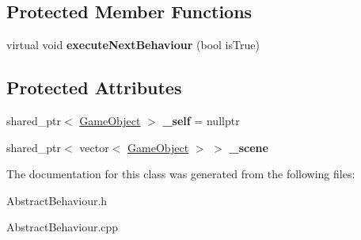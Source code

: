 \subsection*{Protected Member Functions}
\begin{DoxyCompactItemize}
\item 
\mbox{\label{class_abstract_behaviour_a931021cf02c0a2dd40fac4a86d1d5d25}} 
virtual void {\bfseries execute\+Next\+Behaviour} (bool is\+True)
\end{DoxyCompactItemize}
\subsection*{Protected Attributes}
\begin{DoxyCompactItemize}
\item 
\mbox{\label{class_abstract_behaviour_a4e825e734fdfe11ee2d030f909765845}} 
shared\+\_\+ptr$<$ \mbox{\hyperlink{class_game_object}{Game\+Object}} $>$ {\bfseries \+\_\+self} = nullptr
\item 
\mbox{\label{class_abstract_behaviour_a4c97685f487ce0f429276df8d003b70e}} 
shared\+\_\+ptr$<$ vector$<$ \mbox{\hyperlink{class_game_object}{Game\+Object}} $>$ $>$ {\bfseries \+\_\+scene}
\end{DoxyCompactItemize}


The documentation for this class was generated from the following files\+:\begin{DoxyCompactItemize}
\item 
Abstract\+Behaviour.\+h\item 
Abstract\+Behaviour.\+cpp\end{DoxyCompactItemize}
